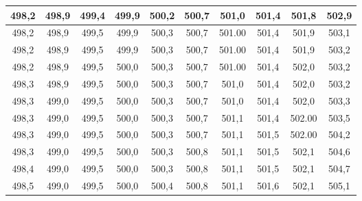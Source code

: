 \documentclass[12pt]{article}
\begin{document}
\begin{table}[H]
\begin{tabular}{|c|c|c|c|c|c|c|c|c|c|}
        498,2 & 498,9 & 499,4 & 499,9 & 500,2 & 500,7 & 501,0  & 501,4 & 501,8  & 502,9 \\ \hline
        498,2 & 498,9 & 499,5 & 499,9 & 500,3 & 500,7 & 501.00 & 501,4 & 501,9  & 503,1 \\ \hline
        498,2 & 498,9 & 499,5 & 499,9 & 500,3 & 500,7 & 501.00 & 501,4 & 501,9  & 503,2 \\ \hline
        498,2 & 498,9 & 499,5 & 500,0 & 500,3 & 500,7 & 501.00 & 501,4 & 502,0  & 503,2 \\ \hline
        498,3 & 498,9 & 499,5 & 500,0 & 500,3 & 500,7 & 501,0  & 501,4 & 502,0  & 503,2 \\ \hline
        498,3 & 499,0 & 499,5 & 500,0 & 500,3 & 500,7 & 501,0  & 501,4 & 502,0  & 503,3 \\ \hline
        498,3 & 499,0 & 499,5 & 500,0 & 500,3 & 500,7 & 501,1  & 501,4 & 502.00 & 503,5 \\ \hline
        498,3 & 499,0 & 499,5 & 500,0 & 500,3 & 500,7 & 501,1  & 501,5 & 502.00 & 504,2 \\ \hline
        498,3 & 499,0 & 499,5 & 500,0 & 500,3 & 500,8 & 501,1  & 501,5 & 502,1  & 504,6 \\ \hline
        498,4 & 499,0 & 499,5 & 500,0 & 500,3 & 500,8 & 501,1  & 501,5 & 502,1  & 504,7 \\ \hline
        498,5 & 499,0 & 499,5 & 500,0 & 500,4 & 500,8 & 501,1  & 501,6 & 502,1  & 505,1 \\ \hline
        \end{tabular}
    \end{table}
\end{document}
